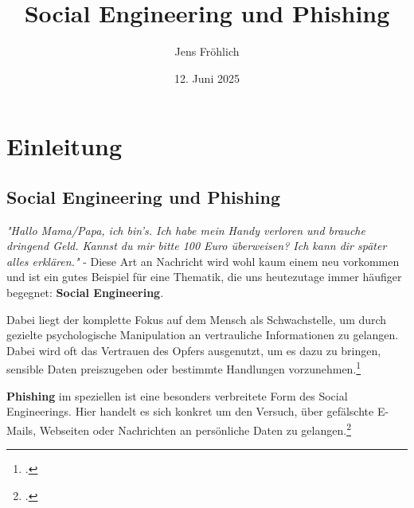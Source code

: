 \documentclass[12pt, a4paper, oneside]{scrartcl}
\title{Social Engineering und Phishing}
\author{Jens Fröhlich}
\date{12. Juni 2025}
\begin{document}

\begin{titlepage}
    \thispagestyle{empty}
    \maketitle
    \vspace{2cm}
    \begin{center}
    \end{center}
\end{titlepage}


\clearpage
\pagestyle{empty}
\tableofcontents


\justify


\pagestyle{scrheadings}
\clearpairofpagestyles

\ihead{}
\chead{}
\ohead{}

\ifoot{}
\cfoot[\pagemark]{\pagemark}
\ofoot{}

\setcounter{page}{2}

\section{Einleitung}

\subsection{Social Engineering und Phishing}
\textit{"Hallo Mama/Papa, ich bin's. Ich habe mein Handy verloren und 
brauche dringend Geld. Kannst du mir bitte 100 Euro überweisen? 
Ich kann dir später alles erklären."} - Diese Art an Nachricht wird wohl kaum einem
neu vorkommen und ist ein gutes Beispiel für eine Thematik, die uns heutezutage immer häufiger begegnet:
\textbf{Social Engineering}.
\par
Dabei liegt der komplette Fokus auf dem Mensch als Schwachstelle, um durch gezielte psychologische
Manipulation an vertrauliche Informationen zu gelangen. Dabei wird oft das Vertrauen des Opfers ausgenutzt, 
um es dazu zu bringen, sensible Daten preiszugeben oder bestimmte Handlungen vorzunehmen.\footcite{BSISocialEngineering}
\par
\textbf{Phishing} im speziellen ist eine besonders verbreitete Form des Social Engineerings. 
Hier handelt es sich konkret um den Versuch, über gefälschte E-Mails, Webseiten oder 
Nachrichten an persönliche Daten zu gelangen.\footcite{BSIPhishing}\\
\end{document}
